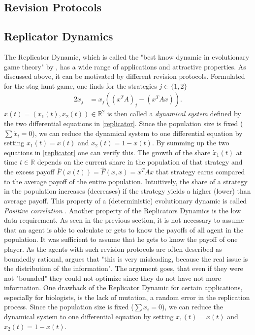 \documentclass[12pt]{article}
\newcommand{\realnumb}{\mathbb{R}}
\begin{document}
\subsection{Revision Protocols}


\subsection{Replicator Dynamics}
The Replicator Dynamic, which is called the "best know dynamic in
evolutionary game theory" by \cite{sandholm_populaton_2010}, has a wide range of applications
and attractive properties. As discussed above, it can be motivated by 
different revision protocols. Formulated for the stag hunt game, one finds for
the strategies $j \in \{1,2\}$
\begin{alignat}{2}
        \dot{x}_j &= x_j\left(\left(x^T A\right)_j - \left(x^T A x\right)\right) 
        \label{eq:replicator}.
\end{alignat}
$x(t)=(x_1(t), x_2(t)) \in \realnumb^2$ is then called a \textit{dynamical
system} defined by the two differential equations in \eqref{replicator}. 
Since the population size is fixed ($\sum\dot{x}_i=0$), 
we can reduce the dynamical system to one differential equation by setting 
$x_1(t) = x(t)$ and $x_2(t) = 1-x(t)$.
By summing up the two equations in \eqref{replicator} one can verify this.
The growth of the share $\dot{x}_1(t)$ at time $t \in \realnumb$ depends on the current share in the
population of that strategy and the excess payoff $\bar{F}(x(t)) 
= \hat{F}(x,x) = x^T A x$ that strategy earns 
compared to the average payoff of the entire population. Intuitively, the
share of a strategy in the population increases (decreases) if the strategy
yields a higher (lower) than average payoff. This property of a (deterministic)
evolutionary dynamic is called \textit{Positive correlation} \cite{sandholm}.
Another property of the Replicators Dynamics is the low data requirement. As 
seen in the previous section, it is not necessary to assume that an agent
is able to calculate or gets to know the payoffs of all agent in the population.
It was sufficient to assume that he gets to know the payoff of one player. 
As the agents with such revision protocols are often described as boundedly
rational, \cite{gintis} argues that "this is very misleading, because the real 
issue is the distribution of the information". The argument goes, that even
if they were not "bounded" they could not optimize since they do not have
not more information. 
One drawback of the Replicator Dynamic for certain applications, especially
for biologists, is the lack of mutation, a random error in the replication 
process.
Since the population size is fixed ($\sum\dot{x}_i=0$), 
we can reduce the dynamical system to one differential equation by setting 
$x_1(t) = x(t)$ and $x_2(t) = 1-x(t)$.
\end{document}
